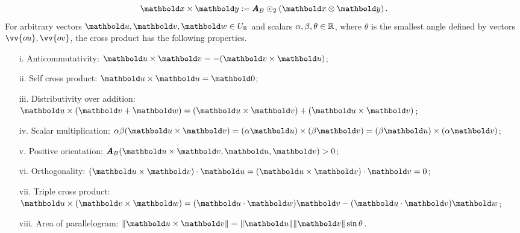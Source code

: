 \begin{equation}\label{eq:crossProduct}
\vto{x}\times\vto{y} := \tnr{A}_B\odot_2 (\vto{x}\otimes\vto{y})\,.
\end{equation}
For arbitrary vectors $\vto{u},\vto{v},\vto{w}\in U_\real$ and scalars $\alpha,\beta,\theta\in\mathbb{R}$, where $\theta$ is the smallest angle defined by vectors $\vv{ou},\vv{ov}$, the cross product has the following properties.
\begin{itemize}
	\setlength\itemsep{.1em}
	\item[i.] Anticommutativity: $\vto{u}\times\vto{v}=-(\vto{v}\times\vto{u})$;
	\item[ii.] Self cross product: $\vto{u}\times\vto{u}=\vto{0}$;
	\item[iii.] Distributivity over addition: $\vto{u}\times(\vto{v}+\vto{w})=(\vto{u}\times\vto{v})+(\vto{u}\times\vto{v})$;
	\item[iv.] Scalar multiplication: $\alpha\beta(\vto{u}\times\vto{v})=(\alpha\vto{u})\times(\beta\vto{v})=(\beta\vto{u})\times(\alpha\vto{v})$;
	\item[v.] Positive orientation: $\tnr{A}_B(\vto{u}\times\vto{v},\vto{u},\vto{v})>0$;
	\item[vi.] Orthogonality: $(\vto{u}\times\vto{v})\cdot\vto{u}=(\vto{u}\times\vto{v})\cdot\vto{v}=0$;
	\item[vii.] Triple cross product: $\vto{u}\times(\vto{v}\times\vto{w})=(\vto{u}\cdot\vto{w})\vto{v}-(\vto{u}\cdot\vto{v})\vto{w}$;
	\item[viii.] Area of parallelogram: $\|\vto{u}\times\vto{v}\|= \|\vto{u} \|\|\vto{v} \|\sin\theta$.
\end{itemize}


